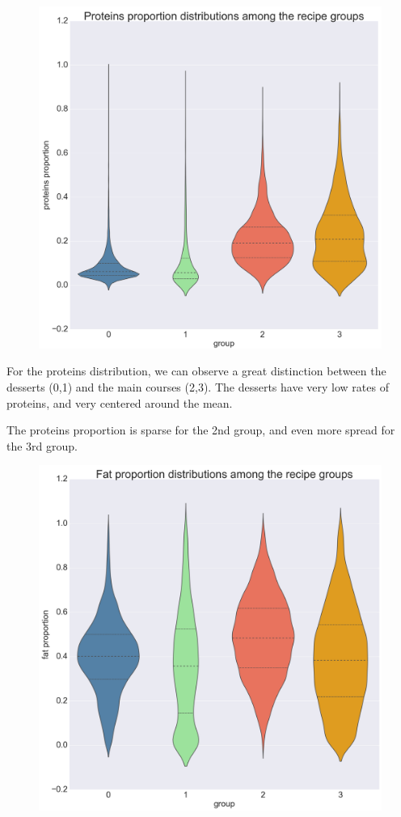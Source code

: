 \documentclass[11pt]{article}
\begin{document}
\begin{figure}[!h]
	\includegraphics[width=\columnwidth]{../protein_prop_distrib-r.png}
	\caption{}
	\label{fig:3}
\end{figure}

For the proteins distribution, we can observe a great distinction between the desserts (0,1) and the main courses (2,3). The desserts have very low rates of proteins, and very centered around the mean.

The proteins proportion is sparse for the 2nd group, and even more spread for the 3rd group.

\begin{figure}[!h]
	\includegraphics[width=\columnwidth]{../fat_prop_distrib-r.png}
	\caption{}
	\label{fig:4}
\end{figure}
\end{document}
